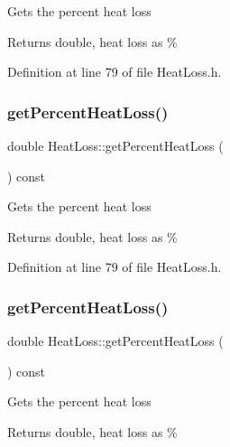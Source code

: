 Gets the percent heat loss \begin{DoxyReturn}{Returns}
double, heat loss as \% 
\end{DoxyReturn}


Definition at line 79 of file Heat\+Loss.\+h.

\mbox{\label{class_heat_loss_acbbf01db5cde157057e4d766cab22382}} 
\subsubsection{\texorpdfstring{get\+Percent\+Heat\+Loss()}{getPercentHeatLoss()}\hspace{0.1cm}{\footnotesize\ttfamily [2/3]}}
{\footnotesize\ttfamily double Heat\+Loss\+::get\+Percent\+Heat\+Loss (\begin{DoxyParamCaption}{ }\end{DoxyParamCaption}) const\hspace{0.3cm}{\ttfamily [inline]}}

Gets the percent heat loss \begin{DoxyReturn}{Returns}
double, heat loss as \% 
\end{DoxyReturn}


Definition at line 79 of file Heat\+Loss.\+h.

\mbox{\label{class_heat_loss_acbbf01db5cde157057e4d766cab22382}} 
\subsubsection{\texorpdfstring{get\+Percent\+Heat\+Loss()}{getPercentHeatLoss()}\hspace{0.1cm}{\footnotesize\ttfamily [3/3]}}
{\footnotesize\ttfamily double Heat\+Loss\+::get\+Percent\+Heat\+Loss (\begin{DoxyParamCaption}{ }\end{DoxyParamCaption}) const\hspace{0.3cm}{\ttfamily [inline]}}

Gets the percent heat loss \begin{DoxyReturn}{Returns}
double, heat loss as \% 
\end{DoxyReturn}


